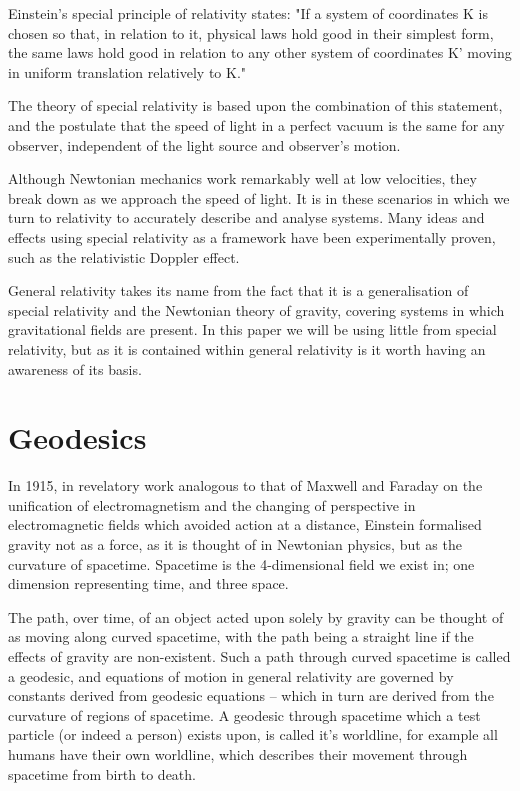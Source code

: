 \documentclass[oneside,openright,frontopenright, singlespacing]{dmathesis}
\begin{document}
\vspace{1em}
	Einstein's special principle of relativity states\cite{einstein1923grundlage}: "If a system of coordinates K is chosen so that, in relation to it, physical laws hold good in their simplest form, the same laws hold good in relation to any other system of coordinates K' moving in uniform translation relatively to K."

\vspace{1em}
	The theory of special relativity is based upon the combination of this statement, and the postulate that the speed of light in a perfect vacuum is the same for any observer, independent of the light source and observer's motion.

\vspace{1em}
	Although Newtonian mechanics work remarkably well at low velocities, they break down as we approach the speed of light. It is in these scenarios in which we turn to relativity to accurately describe and analyse systems. Many ideas and effects using special relativity as a framework have been experimentally proven, such as the relativistic Doppler effect.

\vspace{1em}
	General relativity takes its name from the fact that it is a generalisation of special relativity and the Newtonian theory of gravity, covering systems in which gravitational fields are present. In this paper we will be using little from special relativity, but as it is contained within general relativity is it worth having an awareness of its basis.

\section{Geodesics}\label{sec:Section2.2}
	
	In 1915, in revelatory work analogous to that of Maxwell and Faraday on the unification of electromagnetism and the changing of perspective in electromagnetic fields which avoided action at a distance, Einstein formalised gravity not as a force, as it is thought of in Newtonian physics, but as the curvature of spacetime. Spacetime is the 4-dimensional field we exist in; one dimension representing time, and three space. 

\vspace{1em}
	The path, over time, of an object acted upon solely by gravity can be thought of as moving along curved spacetime, with the path being a straight line if the effects of gravity are non-existent. Such a path through curved spacetime is called a geodesic, and equations of motion in general relativity are governed by constants derived from geodesic equations – which in turn are derived from the curvature of regions of spacetime. A geodesic through spacetime which a test particle (or indeed a person) exists upon, is called it's worldline, for example all humans have their own worldline, which describes their movement through spacetime from birth to death.
\end{document}
